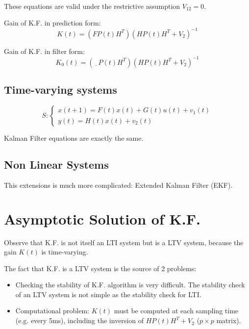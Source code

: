 \begin{remark}
    These equations are valid under the restrictive assumption $V_{12} = 0$.
\end{remark}

\begin{remark}
    Gain of K.F. in prediction form:
    \[
        K(t) = \left( FP(t)H^T \right) \left( HP(t)H^T+V_2 \right)^{-1}
    \]

    Gain of K.F. in filter form:
    \[
        K_0(t) = \left( \underline{\phantom{F}} P(t)H^T \right) \left( HP(t)H^T+V_2 \right)^{-1}
    \]
\end{remark}


\subsection{Time-varying systems}

\[
    S: \begin{cases}
        x(t+1) = F(t)x(t) + G(t)u(t) + v_1(t) \\
        y(t) = H(t)x(t) + v_2(t)
    \end{cases}
\]

Kalman Filter equations are exactly the same.

\subsection{Non Linear Systems}

This extensions is much more complicated: Extended Kalman Filter (EKF).

\section{Asymptotic Solution of K.F.}

Observe that K.F. is not itself an LTI system but is a LTV system, because the gain $K(t)$ is time-varying.

The fact that K.F. is a LTV system is the source of 2 problems:
\begin{itemize}
    \item Checking the stability of K.F. algorithm is very difficult. The stability check of an LTV system is not simple as the stability check for LTI.
    \item Computational problem: $K(t)$ must be computed at each sampling time (e.g. every 5ms), including the inversion of $HP(t)H^T+V_2$ ($p\times p$ matrix).
\end{itemize}

